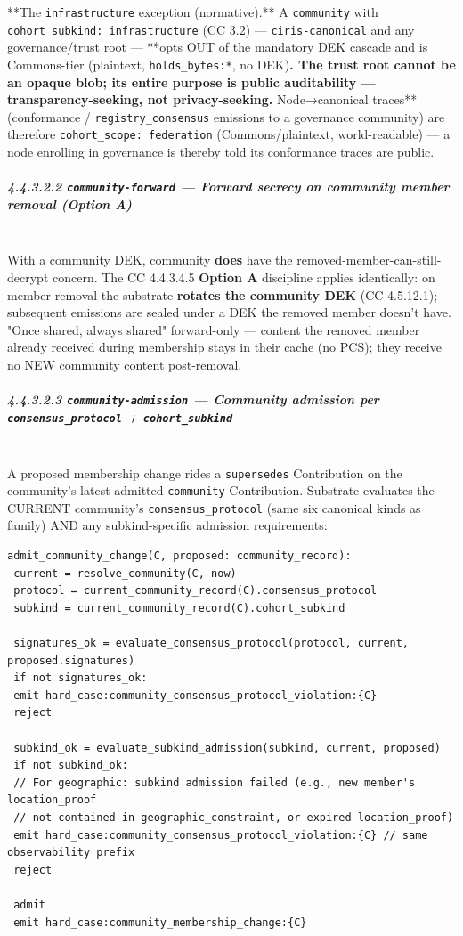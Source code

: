 \documentclass[11pt]{article}
\begin{document}
**The \texttt{infrastructure} exception (normative).** A \texttt{community} with \texttt{cohort\_subkind: infrastructure} (CC 3.2) — \texttt{ciris-canonical} and any governance/trust root — **opts OUT of the mandatory DEK cascade and is Commons-tier (plaintext, \texttt{holds\_bytes:*}, no DEK)\textbf{. The trust root cannot be an opaque blob; its entire purpose is public auditability — transparency-seeking, not privacy-seeking. }Node→canonical traces** (conformance / \texttt{registry\_consensus} emissions to a governance community) are therefore \texttt{cohort\_scope: federation} (Commons/plaintext, world-readable) — a node enrolling in governance is thereby told its conformance traces are public.


\subparagraph{4.4.3.2.2 \texttt{community-forward} — Forward secrecy on community member removal (Option A)}\mbox{}\\


With a community DEK, community \textbf{does} have the removed-member-can-still-decrypt concern. The CC 4.4.3.4.5 \textbf{Option A} discipline applies identically: on member removal the substrate \textbf{rotates the community DEK} (CC 4.5.12.1); subsequent emissions are sealed under a DEK the removed member doesn't have. "Once shared, always shared" forward-only — content the removed member already received during membership stays in their cache (no PCS); they receive no NEW community content post-removal.


\subparagraph{4.4.3.2.3 \texttt{community-admission} — Community admission per \texttt{consensus\_protocol} + \texttt{cohort\_subkind}}\mbox{}\\


A proposed membership change rides a \texttt{supersedes} Contribution on the community's latest admitted \texttt{community} Contribution. Substrate evaluates the CURRENT community's \texttt{consensus\_protocol} (same six canonical kinds as family) AND any subkind-specific admission requirements:


\begin{lstlisting}
admit_community_change(C, proposed: community_record):
 current = resolve_community(C, now)
 protocol = current_community_record(C).consensus_protocol
 subkind = current_community_record(C).cohort_subkind

 signatures_ok = evaluate_consensus_protocol(protocol, current, proposed.signatures)
 if not signatures_ok:
 emit hard_case:community_consensus_protocol_violation:{C}
 reject

 subkind_ok = evaluate_subkind_admission(subkind, current, proposed)
 if not subkind_ok:
 // For geographic: subkind admission failed (e.g., new member's location_proof
 // not contained in geographic_constraint, or expired location_proof)
 emit hard_case:community_consensus_protocol_violation:{C} // same observability prefix
 reject

 admit
 emit hard_case:community_membership_change:{C}
\end{lstlisting}
\end{document}
